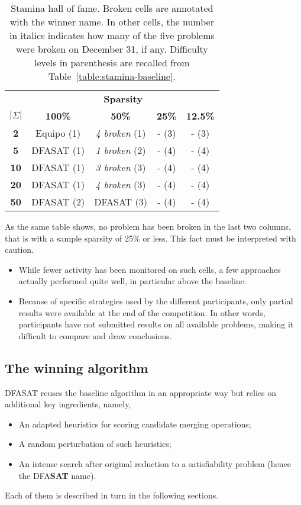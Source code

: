 \begin{table}
\begin{center}
\begin{tabular}{c|c c c c}
&\multicolumn{4}{|c}{\textbf{Sparsity}}\\ 
\textbf{$|\Sigma|$} & \textbf{100\%} & \textbf{50\%} & \textbf{25\%} & \textbf{12.5\%}\\
\hline
\textbf{2}  & Equipo (1) & \emph{4 broken} (1)  & - (3) & - (3) \\
\textbf{5}  & DFASAT (1) & \emph{1 broken} (2)  & - (4) & - (4) \\
\textbf{10} & DFASAT (1) & \emph{3 broken} (3)  & - (4) & - (4) \\
\textbf{20} & DFASAT (1) & \emph{4 broken} (3)  & - (4) & - (4) \\
\textbf{50} & DFASAT (2) & DFASAT (3) & - (4) & - (4) \\
\end{tabular}
\end{center}
\caption[Stamina hall of fame]{Stamina hall of fame. Broken cells are annotated with the winner name. In other cells, the number in italics indicates how many of the five problems were broken on December 31, if any. Difficulty levels in parenthesis are recalled from Table~\ref{table:stamina-baseline}.\label{table:stamina-hall-of-fame}}
\end{table}

As the same table shows, no problem has been broken in the last two columns, that is with a sample sparsity of 25\% or less. This fact must be interpreted with caution. 
\begin{itemize}
\item While fewer activity has been monitored on such cells, a few approaches actually performed quite well, in particular above the baseline. 
\item Because of specific strategies used by the different participants, only partial results were available at the end of the competition. In other words, participants have not submitted results on all available problems, making it difficult to compare and draw conclusions.
\end{itemize}

\subsection{The winning algorithm\label{subsection:stamina-winning}}

DFASAT reuses the baseline algorithm in an appropriate way but relies on additional key ingredients, namely,
\begin{itemize}
\item An adapted heuristics for scoring candidate merging operations;
\item A random perturbation of such heuristics;
\item An intense search after original reduction to a satisfiability problem (hence the DFA\textbf{SAT} name). 
\end{itemize}
Each of them is described in turn in the following sections.

